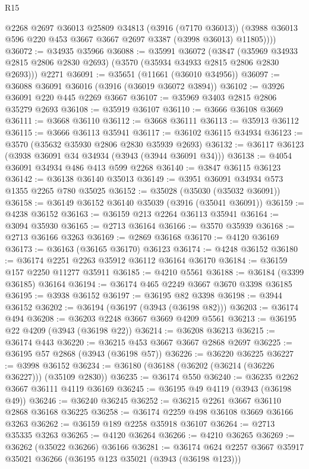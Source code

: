 \begin{lexlean}{R15}
\begin{coremodule}
          @2268
          @2697
          @36013
          @25809
          @34813
          (@3916 (@7170 @36013))
          (@3988 @36013 @596 @220 @453 @3667 @3667 @2697 @3387 (@3998 @36013) @11805))))
@36072 := @34935 @35966
@36088 := @35991
    @36072
    (@3847 (@35969 @34933 @2815 @2806 @2830 @2693) (@3570 (@35934 @34933 @2815 @2806 @2830 @2693)))
    @2271
@36091 := @35651 (@11661 (@36010 @34956))
@36097 := @36088 @36091 @36016 (@3916 (@36019 @36072 @3894))
@36102 := @3926 @36091 @220 @445 @2269 @3667
@36107 := @35969 @3403 @2815 @2806 @35279 @2693
@36108 := @35919 @36107
@36110 := @3666 @36108 @3669
@36111 := @3668 @36110
@36112 := @3668 @36111
@36113 := @35913 @36112
@36115 := @3666 @36113 @35941
@36117 := @36102 @36115 @34934
@36123 := @3570 (@35632 @35930 @2806 @2830 @35939 @2693)
@36132 := @36117 @36123 (@3938 @36091 @34 @34934 (@3943 (@3944 @36091 @34)))
@36138 := @4054 @36091 @34934 @486 @413 @599 @2268
@36140 := @3847 @36115 @36123
@36142 := @36138 @36140 @35013
@36149 := @3951 @36091 @34934 @573 @1355 @2265 @780 @35025
@36152 := @35028 (@35030 (@35032 @36091))
@36158 := @36149 @36152 @36140 @35039 (@3916 (@35041 @36091))
@36159 := @4238 @36152
@36163 := @36159 @213 @2264 @36113 @35941
@36164 := @3094 @35930
@36165 := @2713 @36164
@36166 := @3570 @35939
@36168 := @2713 @36166 @3263
@36169 := @2869 @36168
@36170 := @4120 @36169
@36173 := @36163 (@36165 @36170) @36123
@36174 := @4248 @36152
@36180 := @36174 @2251 @2263 @35912 @36112 @36164 @36170
@36184 := @36159 @157 @2250 @11277 @35911
@36185 := @4210 @5561
@36188 := @36184 (@3399 @36185) @36164
@36194 := @36174 @465 @2249 @3667 @3670 @3398 @36185
@36195 := @3938 @36152
@36197 := @36195 @82 @3398
@36198 := @3944 @36152
@36202 := @36194 (@36197 (@3943 (@36198 @82)))
@36203 := @36174 @494
@36208 := @36203 @2248 @3667 @3669 @4209 @5561
@36213 := @36195 @22 @4209 (@3943 (@36198 @22))
@36214 := @36208 @36213
@36215 := @36174 @443
@36220 := @36215 @453 @3667 @3667 @2868 @2697
@36225 := @36195 @57 @2868 (@3943 (@36198 @57))
@36226 := @36220 @36225
@36227 := @3998 @36152
@36234 := @36180 (@36188 (@36202 (@36214 (@36226 @36227))) (@35109 @2830))
@36235 := @36174 @550
@36240 := @36235 @2262 @3667 @36111 @4119 @36169
@36245 := @36195 @49 @4119 (@3943 (@36198 @49))
@36246 := @36240 @36245
@36252 := @36215 @2261 @3667 @36110 @2868 @36168 @36225
@36258 := @36174 @2259 @498 @36108 @3669 @36166 @3263
@36262 := @36159 @189 @2258 @35918 @36107
@36264 := @2713 @35335 @3263
@36265 := @4120 @36264
@36266 := @4210 @36265
@36269 := @36262 (@35022 @36266) @36166
@36281 := @36174 @624 @2257 @3667 @35917 @35021 @36266 (@36195 @123 @35021 (@3943 (@36198 @123)))

\end{coremodule}
\end{lexlean}
